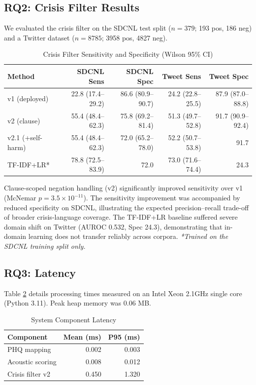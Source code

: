 \documentclass[conference]{IEEEtran}
\begin{document}
\subsection{RQ2: Crisis Filter Results}
We evaluated the crisis filter on the SDCNL \cite{sdcnl_paper} test split ($n=379$; 193 pos, 186 neg) and a Twitter dataset \cite{twitter_dataset} ($n=8785$; 3958 pos, 4827 neg).
\begin{table}[htbp]
\caption{Crisis Filter Sensitivity and Specificity (Wilson 95\% CI)}
\label{tab:crisis_filter}
\centering
\begin{tabular}{lrrrr}
\toprule
\textbf{Method} & \textbf{SDCNL Sens} & \textbf{SDCNL Spec} & \textbf{Tweet Sens} & \textbf{Tweet Spec} \\
\midrule
v1 (deployed) & 22.8 (17.4--29.2) & 86.6 (80.9--90.7) & 24.2 (22.8--25.5) & 87.9 (87.0--88.8) \\
v2 (clause) & 55.4 (48.4--62.3) & 75.8 (69.2--81.4) & 51.3 (49.7--52.8) & 91.7 (90.9--92.4) \\
v2.1 (+self-harm) & 55.4 (48.4--62.3) & 72.0 (65.2--78.0) & 52.2 (50.7--53.8) & 91.7 \\
TF-IDF+LR* & 78.8 (72.5--83.9) & 72.0 & 73.0 (71.6--74.4) & 24.3 \\
\bottomrule
\end{tabular}
\end{table}
Clause-scoped negation handling (v2) significantly improved sensitivity over v1 (McNemar $p=3.5\times10^{-11}$). The sensitivity improvement was accompanied by reduced specificity on SDCNL, illustrating the expected precision--recall trade-off of broader crisis-language coverage. The TF-IDF+LR baseline suffered severe domain shift on Twitter (AUROC 0.532, Spec 24.3), demonstrating that in-domain learning does not transfer reliably across corpora. \textit{*Trained on the SDCNL training split only.}

\subsection{RQ3: Latency}
Table \ref{tab:latency} details processing times measured on an Intel Xeon 2.1GHz single core (Python 3.11). Peak heap memory was 0.06 MB.
\begin{table}[htbp]
\caption{System Component Latency}
\label{tab:latency}
\centering
\begin{tabular}{lrr}
\toprule
\textbf{Component} & \textbf{Mean (ms)} & \textbf{P95 (ms)} \\
\midrule
PHQ mapping & 0.002 & 0.003 \\
Acoustic scoring & 0.008 & 0.012 \\
Crisis filter v2 & 0.450 & 1.320 \\
\bottomrule
\end{tabular}
\end{table}
\end{document}
